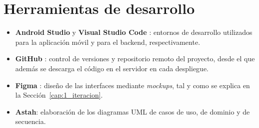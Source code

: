 \section{Herramientas de desarrollo}

\begin{itemize}
    \item \textbf{Android Studio} \cite{androidstudio} y \textbf{Visual Studio Code} \cite{vscode}: entornos de desarrollo utilizados para la aplicación móvil y para el backend, respectivamente.
    \item \textbf{GitHub} \cite{github}: control de versiones y repositorio remoto del proyecto, desde el que además se descarga el código en el servidor en cada despliegue.
    \item \textbf{Figma} \cite{figma}: diseño de las interfaces mediante \emph{mockups}, tal y como se explica en la Sección~\ref{cap:1_iteracion}.
    \item \textbf{Astah}: elaboración de los diagramas UML de casos de uso, de dominio y de secuencia.
\end{itemize}
